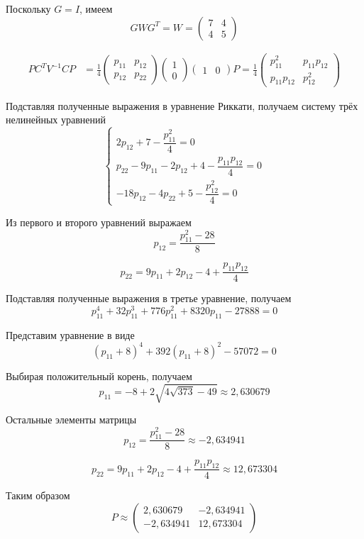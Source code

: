 Поскольку $G=I$, имеем
\[
GWG^T=W=
\begin{pmatrix}7&4\\4&5\end{pmatrix}
\]

\[
\begin{aligned}
PC^TV^{-1}CP
&=\frac14
\begin{pmatrix}
p_{11}&p_{12}\\
p_{12}&p_{22}
\end{pmatrix}
\begin{pmatrix}1\\0\end{pmatrix}
\begin{pmatrix}1&0\end{pmatrix}P=\frac14
\begin{pmatrix}
p_{11}^2&p_{11}p_{12}\\
p_{11}p_{12}&p_{12}^2
\end{pmatrix}
\end{aligned}
\]

Подставляя полученные выражения в уравнение
Риккати, получаем систему трёх нелинейных уравнений
\[
\begin{cases}
2p_{12}+7-\dfrac{p_{11}^2}{4}=0\\[3mm]
p_{22}-9p_{11}-2p_{12}+4
-\dfrac{p_{11}p_{12}}{4}=0\\[3mm]
-18p_{12}-4p_{22}+5
-\dfrac{p_{12}^2}{4}=0
\end{cases}
\]

Из первого и второго уравнений выражаем
\[
p_{12}=\frac{p_{11}^2-28}{8}
\]

\[
p_{22}=9p_{11}+2p_{12}-4+
\frac{p_{11}p_{12}}{4}
\]

Подставляя полученные выражения в третье
уравнение, получаем
\[
p_{11}^4+32p_{11}^3+776p_{11}^2
+8320p_{11}-27888=0
\]

Представим уравнение в виде
\[
(p_{11}+8)^4+392(p_{11}+8)^2-57072=0
\]

Выбирая положительный корень, получаем
\[
p_{11}=-8+2\sqrt{4\sqrt{373}-49}
\approx2{,}630679
\]

Остальные элементы матрицы
\[
p_{12}=\frac{p_{11}^2-28}{8}
\approx-2{,}634941
\]

\[
p_{22}=9p_{11}+2p_{12}-4+
\frac{p_{11}p_{12}}{4}
\approx12{,}673304
\]

Таким образом
\[
P\approx
\begin{pmatrix}
2{,}630679&-2{,}634941\\
-2{,}634941&12{,}673304
\end{pmatrix}
\]

